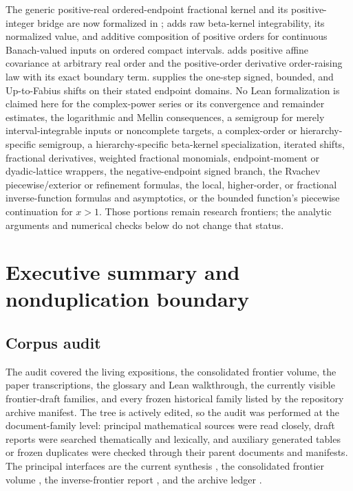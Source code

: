 \documentclass[11pt,oneside]{article}
\theoremstyle{definition}
\theoremstyle{remark}
\newcommand{\1}{\mathbf 1}
\begin{document}
\begin{boxedremark}
The generic positive-real ordered-endpoint fractional kernel and its positive-integer
bridge are now formalized in ;
 adds raw beta-kernel integrability, its
normalized value, and additive composition of positive orders for continuous Banach-valued
inputs on ordered compact intervals.  
adds positive affine covariance at arbitrary real order and the positive-order derivative
order-raising law with its exact boundary term.
 supplies the one-step signed, bounded, and
Up-to-Fabius shifts on their stated endpoint domains.  No Lean
formalization is claimed here for the complex-power series or its convergence and remainder
estimates, the logarithmic and Mellin consequences, a semigroup for merely
interval-integrable inputs or noncomplete targets, a complex-order or hierarchy-specific
semigroup, a hierarchy-specific beta-kernel specialization, iterated shifts, fractional
derivatives, weighted fractional monomials, endpoint-moment or dyadic-lattice wrappers, the
negative-endpoint signed branch, the Rvachev piecewise/exterior or refinement formulas,
the local, higher-order, or fractional inverse-function formulas and
asymptotics, or the bounded function's
piecewise continuation for $x>1$.  Those portions remain research frontiers;
the analytic arguments and numerical checks below do not change that status.
\end{boxedremark}


\newpage

\section{Executive summary and nonduplication boundary}
\label{p2:sec:executive}

\subsection{Corpus audit}
The audit covered the living expositions, the consolidated frontier volume, the
paper transcriptions, the glossary and Lean walkthrough, the currently visible
frontier-draft families, and every frozen historical family listed by the
repository archive manifest.  The tree is actively edited, so the audit was
performed at the document-family level: principal mathematical sources were
read closely, draft reports were searched thematically and lexically, and
auxiliary generated tables or frozen duplicates were checked through their
parent documents and manifests.  The principal interfaces are the current
synthesis \cite{p2:ProveItPrimary}, the consolidated frontier volume
\cite{p2:ProveItFrontiers}, the inverse-frontier report \cite{p2:ProveItInverse}, and
the archive ledger \cite{p2:ProveItArchive}.
\end{document}
